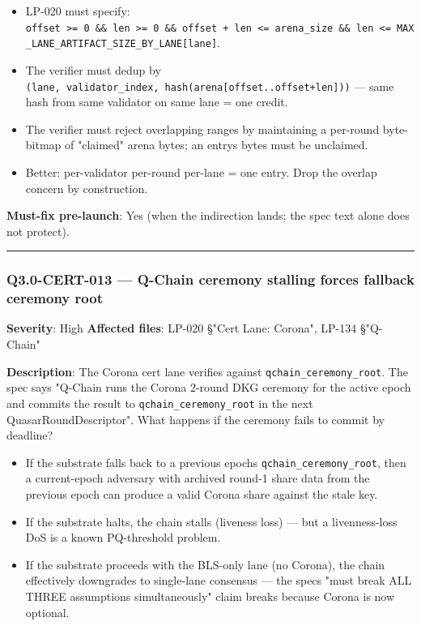 \documentclass[
]{article}
\providecommand{\tightlist}{%
  \setlength{\itemsep}{0pt}\setlength{\parskip}{0pt}}
\begin{document}
\begin{itemize}
\tightlist
\item
  LP-020 must specify:
  \texttt{offset\ \textgreater{}=\ 0\ \&\&\ len\ \textgreater{}=\ 0\ \&\&\ offset\ +\ len\ \textless{}=\ arena\_size\ \&\&\ len\ \textless{}=\ MAX\_LANE\_ARTIFACT\_SIZE\_BY\_LANE{[}lane{]}}.
\item
  The verifier must dedup by
  \texttt{(lane,\ validator\_index,\ hash(arena{[}offset..offset+len{]}))}
  --- same hash from same validator on same lane = one credit.
\item
  The verifier must reject overlapping ranges by maintaining a per-round
  byte-bitmap of "claimed" arena bytes; an entry\textquotesingle s bytes
  must be unclaimed.
\item
  Better: per-validator per-round per-lane = one entry. Drop the overlap
  concern by construction.
\end{itemize}

\textbf{Must-fix pre-launch}: Yes (when the indirection lands; the spec
text alone does not protect).

\begin{center}\rule{0.5\linewidth}{0.5pt}\end{center}

\subsubsection{Q3.0-CERT-013 --- Q-Chain ceremony stalling forces
fallback ceremony
root}\label{q30-cert-013--q-chain-ceremony-stalling-forces-fallback-ceremony-root}

\textbf{Severity}: High \textbf{Affected files}: LP-020 §"Cert Lane:
Corona", LP-134 §"Q-Chain"

\textbf{Description}: The Corona cert lane verifies against
\texttt{qchain\_ceremony\_root}. The spec says "Q-Chain runs the
Corona 2-round DKG ceremony for the active epoch and commits the
result to \texttt{qchain\_ceremony\_root} in the next
QuasarRoundDescriptor". What happens if the ceremony fails to commit by
deadline?

\begin{itemize}
\tightlist
\item
  If the substrate falls back to a previous epoch\textquotesingle s
  \texttt{qchain\_ceremony\_root}, then a current-epoch adversary with
  archived round-1 share data from the previous epoch can produce a
  valid Corona share against the stale key.
\item
  If the substrate halts, the chain stalls (liveness loss) --- but a
  livenness-loss DoS is a known PQ-threshold problem.
\item
  If the substrate proceeds with the BLS-only lane (no Corona), the
  chain effectively downgrades to single-lane consensus --- the
  spec\textquotesingle s "must break ALL THREE assumptions
  simultaneously" claim breaks because Corona is now optional.
\end{itemize}
\end{document}
